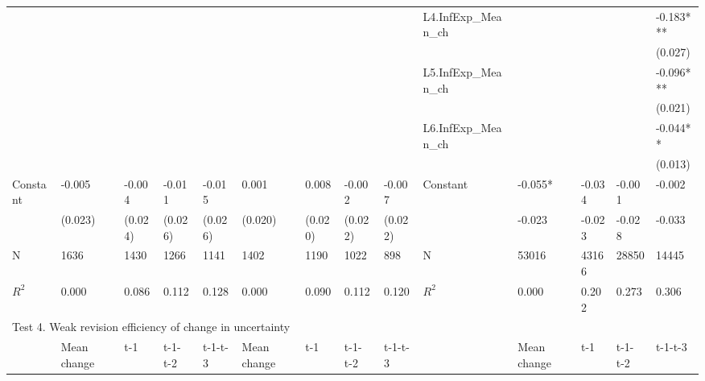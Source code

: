 \documentclass[]{article}
\begin{document}
\begin{table}
\begin{adjustbox}{width={24cm},totalheight={14cm},angle=90}
\begin{tabular}{llllllllllllll}
		&             &           &           &           &               &           &           &           & L4.InfExp\_Mean\_ch &         &           &           & -0.183*** \\
		
		&             &           &           &           &               &           &           &           &                                 &         &           &           & (0.027)    \\
		&             &           &           &           &               &           &           &           & L5.InfExp\_Mean\_ch &         &           &           & -0.096*** \\
		&             &           &           &           &               &           &           &           &                      &         &           &           & (0.021)    \\
		&             &           &           &           &               &           &           &           & L6.InfExp\_Mean\_ch &         &           &           & -0.044**  \\
		&             &           &           &           &               &           &           &           &                                     &         &           &           & (0.013)    \\
		Constant               & -0.005      & -0.004    & -0.011    & -0.015    & 0.001         & 0.008     & -0.002    & -0.007    & Constant              & -0.055* & -0.034    & -0.001    & -0.002    \\
		& (0.023)     & (0.024)   & (0.026)   & (0.026)   & (0.020)       & (0.020)   & (0.022)   & (0.022)   &                                 & -0.023  & -0.023    & -0.028    & -0.033    \\
		\hline 
		N                    & 1636        & 1430      & 1266      & 1141      & 1402          & 1190      & 1022      & 898       & N                   & 53016   & 43166     & 28850     & 14445     \\
	$R^2$                  & 0.000       & 0.086     & 0.112     & 0.128     & 0.000         & 0.090     & 0.112     & 0.120     & $R^2$ &  0.000       & 0.202     & 0.273     & 0.306   \\
		\hline 
		\multicolumn{14}{l}{Test 4. Weak revision efficiency of change in uncertainty}                \\
		\hline                                                                                                                 
		& Mean change & t-1       & t-1- t-2  & t-1-t-3   & Mean change   & t-1       & t-1- t-2  & t-1-t-3   &                      & Mean change   & t-1       & t-1- t-2  & t-1-t-3   \\

\end{tabular}
\end{adjustbox}
\end{table}
\end{document}
